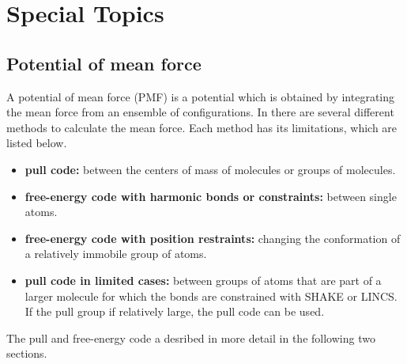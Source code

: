 %
% 
% 
% 
% 
% 
% 
% 
% 
%

\chapter{Special Topics}
\label{ch:special}

\section{Potential of mean force}

A potential of mean force (PMF) is a potential which is obtained
by integrating the mean force from an ensemble of configurations.
In {\gromacs} there are several different methods to calculate the mean force.
Each method has its limitations, which are listed below.
\begin{itemize}
\item{\bf pull code:} between the centers of mass of molecules or groups of molecules.
\item{\bf free-energy code with harmonic bonds or constraints:} between single atoms. 
\item{\bf free-energy code with position restraints:} changing the conformation of a relatively immobile group of atoms.
\item{\bf pull code in limited cases:} between groups of atoms that are
part of a larger molecule for which the bonds are constrained with
SHAKE or LINCS. If the pull group if relatively large,
the pull code can be used.
\end{itemize}
The pull and free-energy code a desribed in more detail
in the following two sections.

